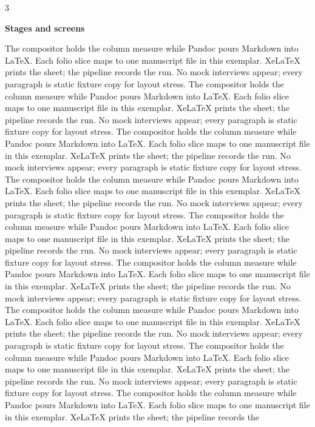 \documentclass[
]{article}
\begin{document}
\begin{multicols}{3}

\textbf{Stages and screens}

The compositor holds the column measure while Pandoc pours Markdown into
LaTeX. Each folio slice maps to one manuscript file in this exemplar.
XeLaTeX prints the sheet; the pipeline records the run. No mock
interviews appear; every paragraph is static fixture copy for layout
stress. The compositor holds the column measure while Pandoc pours
Markdown into LaTeX. Each folio slice maps to one manuscript file in
this exemplar. XeLaTeX prints the sheet; the pipeline records the run.
No mock interviews appear; every paragraph is static fixture copy for
layout stress. The compositor holds the column measure while Pandoc
pours Markdown into LaTeX. Each folio slice maps to one manuscript file
in this exemplar. XeLaTeX prints the sheet; the pipeline records the
run. No mock interviews appear; every paragraph is static fixture copy
for layout stress. The compositor holds the column measure while Pandoc
pours Markdown into LaTeX. Each folio slice maps to one manuscript file
in this exemplar. XeLaTeX prints the sheet; the pipeline records the
run. No mock interviews appear; every paragraph is static fixture copy
for layout stress. The compositor holds the column measure while Pandoc
pours Markdown into LaTeX. Each folio slice maps to one manuscript file
in this exemplar. XeLaTeX prints the sheet; the pipeline records the
run. No mock interviews appear; every paragraph is static fixture copy
for layout stress. The compositor holds the column measure while Pandoc
pours Markdown into LaTeX. Each folio slice maps to one manuscript file
in this exemplar. XeLaTeX prints the sheet; the pipeline records the
run. No mock interviews appear; every paragraph is static fixture copy
for layout stress. The compositor holds the column measure while Pandoc
pours Markdown into LaTeX. Each folio slice maps to one manuscript file
in this exemplar. XeLaTeX prints the sheet; the pipeline records the
run. No mock interviews appear; every paragraph is static fixture copy
for layout stress. The compositor holds the column measure while Pandoc
pours Markdown into LaTeX. Each folio slice maps to one manuscript file
in this exemplar. XeLaTeX prints the sheet; the pipeline records the
run. No mock interviews appear; every paragraph is static fixture copy
for layout stress. The compositor holds the column measure while Pandoc
pours Markdown into LaTeX. Each folio slice maps to one manuscript file
in this exemplar. XeLaTeX prints the sheet; the pipeline records the

\end{multicols}
\end{document}
